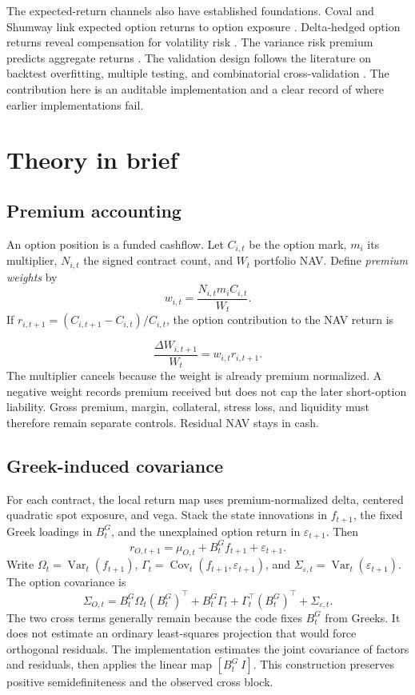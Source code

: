 The expected-return channels also have established foundations. Coval and Shumway link
expected option returns to option exposure \citep{coval_shumway2001}. Delta-hedged option
returns reveal compensation for volatility risk \citep{bakshi_kapadia2003}. The variance
risk premium predicts aggregate returns \citep{bollerslev_tauchen_zhou2009}. The validation
design follows the literature on backtest overfitting, multiple testing, and combinatorial
cross-validation \citep{white2000reality,hansen2005spa,bailey2017pbo,
bailey_lopezdeprado2014}. The contribution here is an auditable implementation and a clear
record of where earlier implementations fail.

\FloatBarrier
\section{Theory in brief}

\subsection{Premium accounting}

An option position is a funded cashflow. Let \(C_{i,t}\) be the option mark, \(m_i\) its
multiplier, \(N_{i,t}\) the signed contract count, and \(W_t\) portfolio NAV. Define
\emph{premium weights} by
\[
  w_{i,t}=\frac{N_{i,t}m_iC_{i,t}}{W_t}.
\]
If \(r_{i,t+1}=(C_{i,t+1}-C_{i,t})/C_{i,t}\), the option contribution to the NAV return is

\[
  \frac{\Delta W_{i,t+1}}{W_t}=w_{i,t}r_{i,t+1}.
\]
The multiplier cancels because the weight is already premium normalized. A negative
weight records premium received but does not cap the later short-option liability. Gross
premium, margin, collateral, stress loss, and liquidity must therefore remain separate
controls. Residual NAV stays in cash.

\subsection{Greek-induced covariance}

For each contract, the local return map uses premium-normalized delta, centered quadratic
spot exposure, and vega. Stack the state innovations in \(f_{t+1}\), the fixed Greek
loadings in \(B_t^G\), and the unexplained option return in
\(\varepsilon_{t+1}\). Then
\[
 r_{O,t+1}=\mu_{O,t}+B_t^G f_{t+1}+\varepsilon_{t+1}.
\]
Write
\(
\Omega_t=\operatorname{Var}_t(f_{t+1})
\),
\(
\Gamma_t=\operatorname{Cov}_t(f_{t+1},\varepsilon_{t+1})
\), and
\(
\Sigma_{\varepsilon,t}=\operatorname{Var}_t(\varepsilon_{t+1})
\). The option covariance is
\[
 \Sigma_{O,t}
 =B_t^G\Omega_t(B_t^G)^\top
 +B_t^G\Gamma_t
 +\Gamma_t^\top(B_t^G)^\top
 +\Sigma_{\varepsilon,t}.
\]
The two cross terms generally remain because the code fixes \(B_t^G\) from Greeks. It does
not estimate an ordinary least-squares projection that would force orthogonal residuals.
The implementation estimates the joint covariance of factors and residuals, then applies
the linear map \([B_t^G\ I]\). This construction preserves positive semidefiniteness and
the observed cross block.

